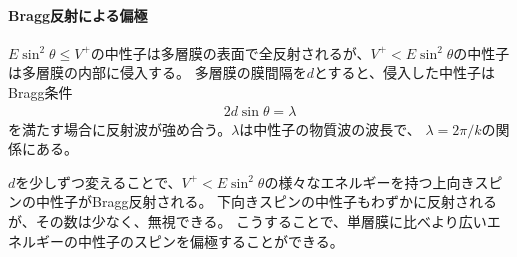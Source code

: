 \paragraph{Bragg反射による偏極}
$E\sin^2\theta\leq V^+$の中性子は多層膜の表面で全反射されるが、$V^+<E\sin^2\theta$の中性子は多層膜の内部に侵入する。
多層膜の膜間隔を$d$とすると、侵入した中性子はBragg条件
\begin{align}
2d\sin\theta=\lambda
\end{align}
を満たす場合に反射波が強め合う。$\lambda$は中性子の物質波の波長で、
$\lambda=2\pi/k$の関係にある。

$d$を少しずつ変えることで、$V^+<E\sin^2\theta$の様々なエネルギーを持つ上向きスピンの中性子がBragg反射される。
下向きスピンの中性子もわずかに反射されるが、その数は少なく、無視できる。
こうすることで、単層膜に比べより広いエネルギーの中性子のスピンを偏極することができる。
